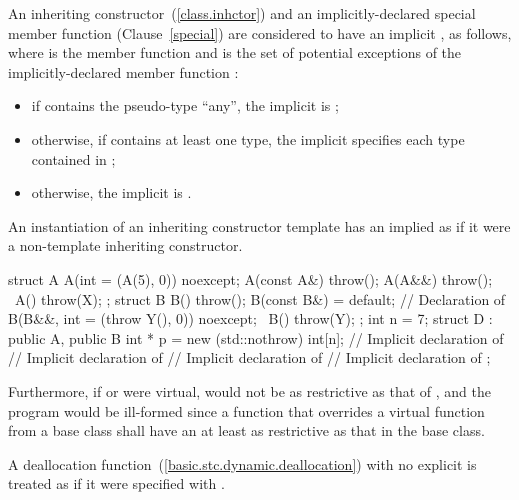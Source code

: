 \pnum
An inheriting constructor~(\ref{class.inhctor}) and an implicitly-declared
special member function (Clause~\ref{special}) are considered to have an
implicit , as follows, where  is
the member function and  is the set of potential exceptions of the
implicitly-declared member function :
\begin{itemize}
\item
if  contains the pseudo-type ``any'', the implicit
 is ;
\item
otherwise, if  contains at least one type, the implicit
 specifies each type 
contained in ;
\item
otherwise, the implicit  is
.
\end{itemize}
    
\enternote An instantiation of an inheriting constructor template has
an implied  as if it were a non-template
inheriting constructor.\exitnote
\enterexample
\begin{codeblock}
struct A {
  A(int = (A(5), 0)) noexcept;
  A(const A&) throw();
  A(A&&) throw();
  ~A() throw(X);
};
struct B {
  B() throw();
  B(const B&) = default; // Declaration of 
  B(B&&, int = (throw Y(), 0)) noexcept;
  ~B() throw(Y);
};
int n = 7;
struct D : public A, public B {
    int * p = new (std::nothrow) int[n];
    // Implicit declaration of 
    // Implicit declaration of 
    // Implicit declaration of 
    // Implicit declaration of 
};
\end{codeblock}

Furthermore, if
or
were virtual,
would not be as restrictive as that of
,
and the program would be ill-formed since a function that overrides a virtual
function from a base class shall have an 
 at least as restrictive as that in the base class.
\exitexample

\pnum
A deallocation function~(\ref{basic.stc.dynamic.deallocation}) with no explicit 
 is treated as if it were specified with
.

